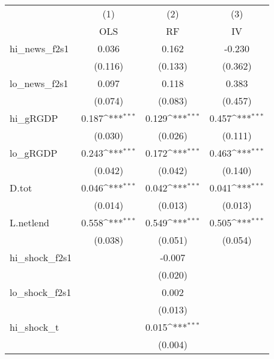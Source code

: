 {
\def\sym#1{\ifmmode^{#1}\else\(^{#1}\)\fi}
\begin{tabular}{l*{3}{c}}
\toprule
            &\multicolumn{1}{c}{(1)}&\multicolumn{1}{c}{(2)}&\multicolumn{1}{c}{(3)}\\
            &\multicolumn{1}{c}{OLS}&\multicolumn{1}{c}{RF}&\multicolumn{1}{c}{IV}\\
\midrule
hi\_news\_f2s1&       0.036         &       0.162         &      -0.230         \\
            &     (0.116)         &     (0.133)         &     (0.362)         \\
\addlinespace
lo\_news\_f2s1&       0.097         &       0.118         &       0.383         \\
            &     (0.074)         &     (0.083)         &     (0.457)         \\
\addlinespace
hi\_gRGDP    &       0.187\sym{***}&       0.129\sym{***}&       0.457\sym{***}\\
            &     (0.030)         &     (0.026)         &     (0.111)         \\
\addlinespace
lo\_gRGDP    &       0.243\sym{***}&       0.172\sym{***}&       0.463\sym{***}\\
            &     (0.042)         &     (0.042)         &     (0.140)         \\
\addlinespace
D.tot       &       0.046\sym{***}&       0.042\sym{***}&       0.041\sym{***}\\
            &     (0.014)         &     (0.013)         &     (0.013)         \\
\addlinespace
L.netlend   &       0.558\sym{***}&       0.549\sym{***}&       0.505\sym{***}\\
            &     (0.038)         &     (0.051)         &     (0.054)         \\
\addlinespace
hi\_shock\_f2s1&                     &      -0.007         &                     \\
            &                     &     (0.020)         &                     \\
\addlinespace
lo\_shock\_f2s1&                     &       0.002         &                     \\
            &                     &     (0.013)         &                     \\
\addlinespace
hi\_shock\_t  &                     &       0.015\sym{***}&                     \\
            &                     &     (0.004)         &                     \\

\end{tabular}}

